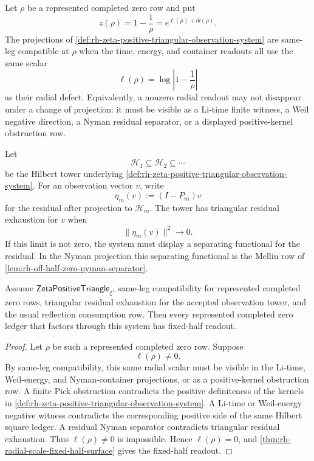 \begin{definition}
\label{def:rh-same-leg-compatibility}
Let $\rho$ be a represented completed zero row and put
$$
z(\rho)=1-\frac1\rho=e^{\ell(\rho)+i\theta(\rho)}.
$$
The projections of
\autoref{def:rh-zeta-positive-triangular-observation-system} are
same-leg compatible at $\rho$ when the time, energy, and container
readouts all use the same scalar
$$
\ell(\rho)=\log\left|1-\frac1\rho\right|
$$
as their radial defect.  Equivalently, a nonzero radial readout may not
disappear under a change of projection: it must be visible as a
Li-time finite witness, a Weil negative direction, a Nyman residual
separator, or a displayed positive-kernel obstruction row.
\end{definition}

\begin{definition}
\label{def:rh-triangular-residual-exhaustion}
Let
$$
\mathcal H_1\subseteq\mathcal H_2\subseteq\cdots
$$
be the Hilbert tower underlying
\autoref{def:rh-zeta-positive-triangular-observation-system}.  For an
observation vector $v$, write
$$
\eta_m(v):=(I-P_m)v
$$
for the residual after projection to $\mathcal H_m$.  The tower has
triangular residual exhaustion for $v$ when
$$
\|\eta_m(v)\|^2\to0.
$$
If this limit is not zero, the system must display a separating
functional for the residual.  In the Nyman projection this separating
functional is the Mellin row of
\autoref{lem:rh-off-half-zero-nyman-separator}.
\end{definition}

\begin{theorem}
\label{thm:rh-positive-triangle-controls-represented-observations}
Assume $\mathsf{ZetaPositiveTriangle}_{\xi}$, same-leg compatibility for
represented completed zero rows, triangular residual exhaustion for the
accepted observation tower, and the usual reflection consumption row.
Then every represented completed zero ledger that factors through this
system has fixed-half readout.
\end{theorem}

\begin{proof}
Let $\rho$ be such a represented completed zero row.  Suppose
$$
\ell(\rho)\ne0.
$$
By same-leg compatibility, this same radial scalar must be visible in
the Li-time, Weil-energy, and Nyman-container projections, or as a
positive-kernel obstruction row.  A finite Pick obstruction contradicts
the positive definiteness of the kernels in
\autoref{def:rh-zeta-positive-triangular-observation-system}.  A
Li-time or Weil-energy negative witness contradicts the corresponding
positive side of the same Hilbert square ledger.  A residual Nyman
separator contradicts triangular residual exhaustion.  Thus
$\ell(\rho)\ne0$ is impossible.  Hence $\ell(\rho)=0$, and
\autoref{thm:rh-radial-scale-fixed-half-surface} gives the fixed-half
readout.
\end{proof}

